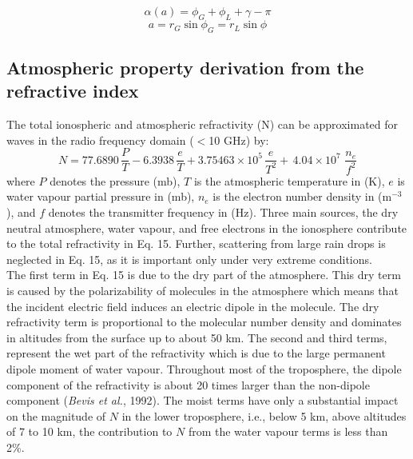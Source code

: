 \documentclass[a4paper,12pt,twoside]{article}
\begin{document}
\begin{equation}
	\alpha \left(a\right)=\phi _{G} +\phi _{L} +\gamma -\pi
\end{equation}
\begin{equation}
	a=r_{G}^{} \sin \phi _{G} =r_{L}^{} \sin \phi 
\end{equation}

\subsection{Atmospheric property derivation from the refractive index}

The total ionospheric and atmospheric refractivity (N) can be approximated for waves in the radio frequency domain ($\mathrm{<}$10 GHz) by:
\begin{equation}
	N=77.6890\, \frac{P}{T} -6.3938\, \frac{e}{T } +3.75463\times 10^{5} \, \frac{e}{T^{2} } +\, 4.04\times 10^{7} \, \, \frac{n_{e} }{f^{2} } 
\end{equation}
where $P$ denotes the pressure (mb), $T$ is the atmospheric temperature in (K), $e$ is water vapour partial pressure in (mb), $n_{e}$ is the electron number density in (m${}^{-3}$), and $f$ denotes the transmitter frequency in (Hz). Three main sources, the dry neutral atmosphere, water vapour, and free electrons in the ionosphere contribute to the total refractivity in Eq. 15. Further, scattering from large rain drops is neglected in Eq. 15, as it is important only under very extreme conditions.\\

\noindent The first term in Eq. 15 is due to the dry part of the atmosphere. This dry term is caused by the polarizability of molecules in the atmosphere which means that the incident electric field induces an electric dipole in the molecule. The dry refractivity term is proportional to the molecular number density and dominates in altitudes from the surface up to about 50 km. The second and third terms, represent the wet part of the refractivity which is due to the large permanent dipole moment of water vapour. Throughout most of the troposphere, the dipole component of the refractivity is about 20 times larger than the non-dipole component (\textit{Bevis et al.}, 1992). The moist terms have only a substantial impact on the magnitude of $ N$ in the lower troposphere, i.e., below 5 km, above altitudes of 7 to 10 km, the contribution to $N$ from the water vapour terms is less than 2\%.\\
\end{document}
